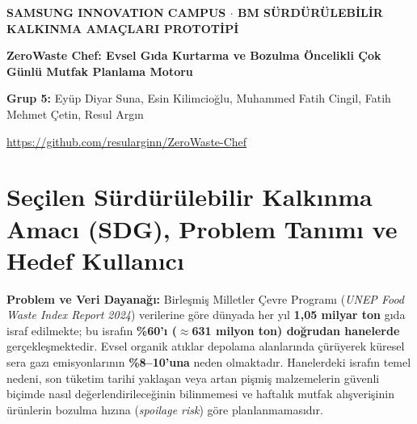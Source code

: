 \documentclass[9pt,a4paper]{article}
\begin{document}
\shorthandoff{=}

\begin{tcolorbox}[
  enhanced,
  colback=undpblue,
  colframe=undpblue,
  arc=5pt,
  boxrule=0pt,
  left=8pt, right=8pt, top=5pt, bottom=5pt
]
  \begin{minipage}[c]{0.72\textwidth}
    {\fontsize{7.2}{8.8}\selectfont\bfseries\color{white!85!yellow} SAMSUNG INNOVATION CAMPUS $\cdot$ BM SÜRDÜRÜLEBİLİR KALKINMA AMAÇLARI PROTOTİPİ\par}\vspace{2pt}
    {\fontsize{13}{15.5}\selectfont\bfseries\color{white} ZeroWaste Chef: Evsel Gıda Kurtarma ve Bozulma Öncelikli Çok Günlü Mutfak Planlama Motoru\par}\vspace{2.5pt}
    {\fontsize{7.8}{9.5}\selectfont\color{white!92} \textbf{Grup 5:} Eyüp Diyar Suna, Esin Kilimcioğlu, Muhammed Fatih Cingil, Fatih Mehmet Çetin, Resul Argın\par}
  \end{minipage}%
  \hfill
  \begin{minipage}[c]{0.26\textwidth}
    \raggedleft
    \leavevmode{}\par\vspace{1.5pt}
    \leavevmode{}\par\vspace{1.5pt}
    {\fontsize{6.8}{8}\selectfont\color{white!90} \url{https://github.com/resularginn/ZeroWaste-Chef}\par}
  \end{minipage}
\end{tcolorbox}
\vspace{-5pt}

\section{Seçilen Sürdürülebilir Kalkınma Amacı (SDG), Problem Tanımı ve Hedef Kullanıcı}
\textbf{Problem ve Veri Dayanağı:} Birleşmiş Milletler Çevre Programı (\emph{UNEP Food Waste Index Report 2024}) verilerine göre dünyada her yıl \textbf{1,05 milyar ton} gıda israf edilmekte; bu israfın \textbf{\%60'ı ($\approx$631 milyon ton) doğrudan hanelerde} gerçekleşmektedir. Evsel organik atıklar depolama alanlarında çürüyerek küresel sera gazı emisyonlarının \textbf{\%8--10'una} neden olmaktadır. Hanelerdeki israfın temel nedeni, son tüketim tarihi yaklaşan veya artan pişmiş malzemelerin güvenli biçimde nasıl değerlendirileceğinin bilinmemesi ve haftalık mutfak alışverişinin ürünlerin bozulma hızına (\emph{spoilage risk}) göre planlanmamasıdır.
\end{document}

